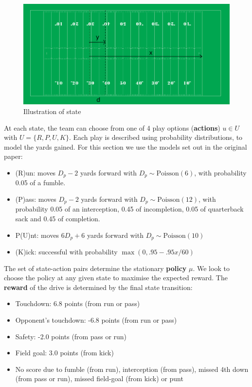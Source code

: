 \documentclass[11pt, oneside]{article}   	%
\begin{document}
\begin{figure}[ht!]
\centering
\includegraphics[width=155mm]{../images/field.png}
\caption{Illustration of state}
\end{figure}

At each state, the team can choose from one of 4 play options (\textbf{actions}) $u \in U$ with $U=\{R, P, U, K\}$. Each play is described using probability distributions, to model the yards gained. For this section we use the models set out in the original paper:
\begin{itemize}
\item (R)un: moves $D_p - 2$ yards forward with $D_p \sim \text{Poisson}(6)$, with probability 0.05 of a fumble.
\item (P)ass: moves $D_p - 2$ yards forward with $D_p \sim \text{Poisson}(12)$, with probability 0.05 of an interception, 0.45 of incompletion, 0.05 of quarterback sack and 0.45 of completion. 
\item P(U)nt: moves $6 D_p  + 6$ yards forward with $D_p \sim \text{Poisson}(10)$ 
\item (K)ick: successful with probability $\max(0, .95 - .95x/60)$
\end{itemize}
The set of state-action pairs determine the stationary \textbf{policy} $\mu$. We look to choose the policy at any given state to maximise the expected reward. The \textbf{reward} of the drive is determined by the final state transition:
\begin{itemize}
\item Touchdown: 6.8 points (from run or pass) 
\item Opponent's touchdown: -6.8 points (from run or pass)
\item Safety: -2.0 points (from pass or run)
\item Field goal: 3.0 points (from kick)
\item No score due to fumble (from run), interception (from pass), missed 4th down (from pass or run), missed field-goal (from kick) or punt
\end{itemize}
\end{document}
